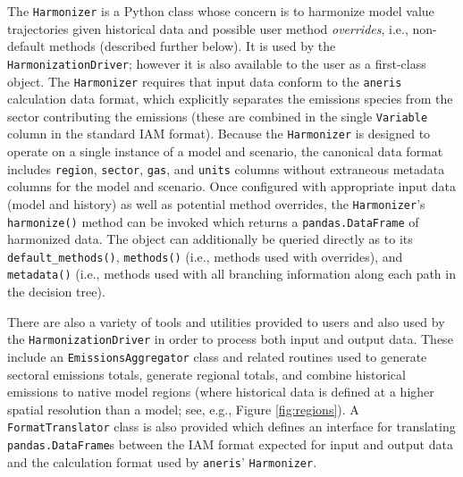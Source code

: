 \documentclass[review]{elsarticle}
\newcommand{\code}[1]{\lstinline[basicstyle=\ttfamily\color{black}]|#1|}
\begin{document}
The \texttt{Harmonizer} is a Python class whose concern is to harmonize model
value trajectories given historical data and possible user method
\textit{overrides}, i.e., non-default methods (described further below). It is
used by the \texttt{HarmonizationDriver}; however it is also available to the
user as a first-class object. The \texttt{Harmonizer} requires that input data
conform to the \code{aneris} calculation data format, which explicitly separates
the emissions species from the sector contributing the emissions (these are
combined in the single \code{Variable} column in the standard IAM
format). Because the \texttt{Harmonizer} is designed to operate on a single
instance of a model and scenario, the canonical data format includes
\texttt{region}, \texttt{sector}, \texttt{gas}, and \texttt{units} columns
without extraneous metadata columns for the model and scenario. Once configured
with appropriate input data (model and history) as well as potential method
overrides, the \texttt{Harmonizer}'s \texttt{harmonize()} method can be invoked
which returns a \texttt{pandas.DataFrame} of harmonized data. The object can
additionally be queried directly as to its \texttt{default\_methods()},
\texttt{methods()} (i.e., methods used with overrides), and \texttt{metadata()}
(i.e., methods used with all branching information along each path in the
decision tree).

There are also a variety of tools and utilities provided to users and also used
by the \texttt{HarmonizationDriver} in order to process both input and output
data. These include an \texttt{EmissionsAggregator} class and related routines
used to generate sectoral emissions totals, generate regional totals, and
combine historical emissions to native model regions (where historical data is
defined at a higher spatial resolution than a model; see, e.g., Figure
\ref{fig:regions}). A \texttt{FormatTranslator} class is also provided which
defines an interface for translating \texttt{pandas.DataFrame}s between the IAM
format expected for input and output data and the calculation format used by
\code{aneris}' \texttt{Harmonizer}.
\end{document}
